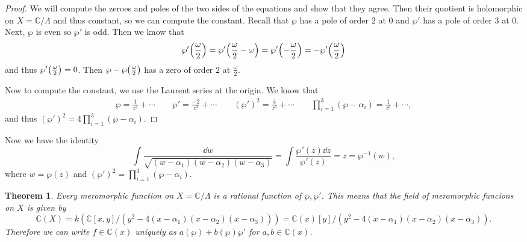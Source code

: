 \documentclass[leqno, openany]{memoir}
\newtheorem{thm}{Theorem}[section]
\theoremstyle{definition}
\theoremstyle{remark}
\theoremstyle{plain}
\theoremstyle{definition}
\theoremstyle{remark}
\newcommand{\C}{\mathbb{C}}
\begin{document}
\begin{proof} We will compute the zeroes and poles of the two sides of the
    equations and show that they agree. Then their quotient is holomorphic on
    $X = \C /\Lambda$ and thus constant, so we can compute the constant. Recall
    that $\wp$ has a pole of order $2$ at $0$ and $\wp'$ has a pole of order
    $3$ at $0$. Next, $\wp$ is even so $\wp'$ is odd. Then we know that \[
    \wp'\qty(\frac{\omega}{2}) = \wp'\qty(\frac{\omega}{2} - \omega) =
\wp'\qty(-\frac{\omega}{2}) = -\wp'\qty(\frac{\omega}{2}) \] and thus
$\wp'\qty(\frac{\omega}{2}) = 0$. Then $\wp - \wp\qty(\frac{\omega}{2})$ has a
zero of order $2$ at $\frac{\omega}{2}$.

    Now to compute the constant, we use the Laurent series at the origin. We
    know that \begin{align*} \wp = \frac{1}{z^2} + \cdots \qquad \wp' =
        \frac{-2}{z^3} + \cdots \qquad {(\wp')}^2 = \frac{4}{z^6} + \cdots
        \qquad \prod_{i=1}^3(\wp - \alpha_i) = \frac{1}{z^6} + \cdots,
    \end{align*} and thus ${(\wp')}^2 = 4 \prod_{i=1}^3 (\wp - \alpha_i)$.
\end{proof}

Now we have the identity \[ \int
\frac{\dd{w}}{\sqrt{(w-\alpha_1)(w-\alpha_2)(w-\alpha_3)}} = \int \frac{\wp'(z)
\dd{z}}{\wp'(z)} = z = \wp^{-1}(w), \] where $w = \wp(z)$ and ${(\wp')}^2 =
\prod_{i=1}^3 (\wp - \alpha_i)$.

\begin{thm} Every meromorphic function on $X = \C / \Lambda$ is a rational
    function of $\wp, \wp'$. This means that the field of meromorphic funcions
    on $X$ is given by \[ \C(X) = k(\C[x,y]/(y^2 -
    4(x-\alpha_1)(x-\alpha_2)(x-\alpha_3))) = \C(x)[y]/(y^2 -
4(x-\alpha_1)(x-\alpha_2)(x-\alpha_3)). \] Therefore we can write $f \in \C(x)$
uniquely as $a(\wp) + b(\wp) \wp'$ for $a,b \in \C(x)$.  \end{thm}
\end{document}
